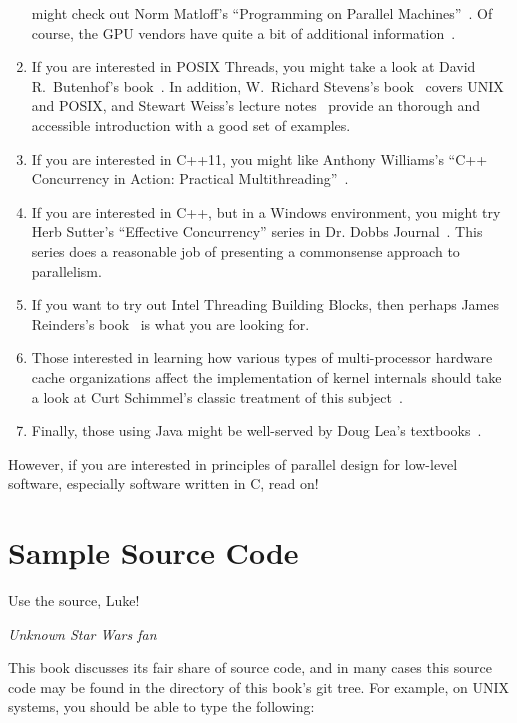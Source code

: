 \begin{enumerate}
	might check out Norm Matloff's ``Programming on
	Parallel Machines''~\cite{NormMatloff2013ParProcBook}.
	Of course, the GPU vendors have quite a bit of additional
	information~\cite{AMD2017OpenCL,CyrilZeller2011GPGPUbasics,NVidia2017GPGPU,NVidia2017GPGPU-university}.
\item	If you are interested in POSIX Threads, you might take
	a look at David R.~Butenhof's book~\cite{Butenhof1997pthreads}.
	In addition,
	W.~Richard Stevens's book~\cite{WRichardStevens1992}
	covers UNIX and POSIX, and Stewart Weiss's lecture
	notes~\cite{StewartWeiss2013UNIX} provide an
	thorough and accessible introduction with a good set of
	examples.
\item	If you are interested in C++11, you might like
	Anthony Williams's ``C++ Concurrency in Action: Practical
	Multithreading''~\cite{AnthonyWilliams2012}.
\item	If you are interested in C++, but in a Windows environment,
	you might try Herb Sutter's ``Effective Concurrency''
	series in
	Dr. Dobbs Journal~\cite{HerbSutter2008EffectiveConcurrency}.
	This series does a reasonable job of presenting a
	commonsense approach to parallelism.
\item	If you want to try out Intel Threading Building Blocks,
	then perhaps James Reinders's book~\cite{Reinders2007Textbook}
	is what you are looking for.
\item	Those interested in learning how various types of multi-processor
	hardware
	cache organizations affect the implementation of kernel
	internals should take a look at Curt Schimmel's classic
	treatment of this subject~\cite{Schimmel:1994:USM:175689}.
\item	Finally, those using Java might be well-served by Doug Lea's
	textbooks~\cite{DougLea1997Textbook,Goetz2007Textbook}.
\end{enumerate}

However, if you are interested in principles of parallel design
for low-level software, especially software written in C, read on!

\section{Sample Source Code}
\label{sec:howto:Sample Source Code}
%
\epigraph{Use the source, Luke!}{\emph{Unknown Star Wars fan}}

This book discusses its fair share of source code, and in many cases
this source code may be found in the  directory
of this book's git tree.
For example, on UNIX systems, you should be able to type the following:

